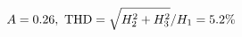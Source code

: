 \documentclass[preview]{standalone}
\begin{document}
\begin{align*}
\special{dvisvgm:raw <g id='unique000'>}A=0.26,\ \text{THD}=\sqrt{H_2^2+H_3^2}/H_1=5.2\%\special{dvisvgm:raw </g>}
\end{align*}
\end{document}
